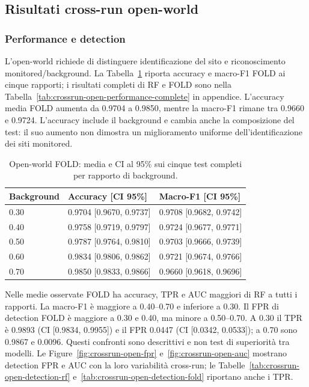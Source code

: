 \documentclass[11pt,a4paper]{article}
\begin{document}
\subsection{Risultati cross-run open-world}
\subsubsection{Performance e detection}
L'open-world richiede di distinguere identificazione del sito e riconoscimento monitored/background. La Tabella~\ref{tab:crossrun-open-performance} riporta accuracy e macro-F1 FOLD ai cinque rapporti; i risultati completi di RF e FOLD sono nella Tabella~\ref{tab:crossrun-open-performance-complete} in appendice. L'accuracy media FOLD aumenta da 0.9704 a 0.9850, mentre la macro-F1 rimane tra 0.9660 e 0.9724. L'accuracy include il background e cambia anche la composizione del test: il suo aumento non dimostra un miglioramento uniforme dell'identificazione dei siti monitored.

\begin{table}[htbp]
\centering\footnotesize
\caption{Open-world FOLD: media e CI al 95\% sui cinque test completi per rapporto di background.}
\label{tab:crossrun-open-performance}
\begin{tabular}{lll}
\toprule
Background & Accuracy [CI 95\%] & Macro-F1 [CI 95\%] \\
\midrule
0.30 & 0.9704 [0.9670, 0.9737] & 0.9708 [0.9682, 0.9742] \\
0.40 & 0.9758 [0.9719, 0.9797] & 0.9724 [0.9677, 0.9771] \\
0.50 & 0.9787 [0.9764, 0.9810] & 0.9703 [0.9666, 0.9739] \\
0.60 & 0.9834 [0.9806, 0.9862] & 0.9721 [0.9674, 0.9766] \\
0.70 & 0.9850 [0.9833, 0.9866] & 0.9660 [0.9618, 0.9696] \\
\bottomrule
\end{tabular}
\end{table}

Nelle medie osservate FOLD ha accuracy, TPR e AUC maggiori di RF a tutti i rapporti. La macro-F1 è maggiore a 0.40--0.70 e inferiore a 0.30. Il FPR di detection FOLD è maggiore a 0.30 e 0.40, ma minore a 0.50--0.70. A 0.30 il TPR è 0.9893 (CI [0.9834, 0.9955]) e il FPR 0.0447 (CI [0.0342, 0.0533]); a 0.70 sono 0.9867 e 0.0096. Questi confronti sono descrittivi e non test di superiorità tra modelli. Le Figure~\ref{fig:crossrun-open-fpr} e~\ref{fig:crossrun-open-auc} mostrano detection FPR e AUC con la loro variabilità cross-run; le Tabelle~\ref{tab:crossrun-open-detection-rf} e~\ref{tab:crossrun-open-detection-fold} riportano anche i TPR.
\end{document}
